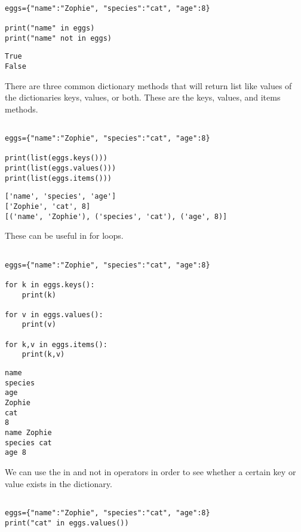 \documentclass[11pt]{article}
\begin{document}
\begin{verbatim}

eggs={"name":"Zophie", "species":"cat", "age":8}

print("name" in eggs)
print("name" not in eggs)

\end{verbatim}

\begin{verbatim}
True
False
\end{verbatim}


There are three common dictionary methods that will return list like values of the dictionaries keys, values, or both. These are the keys, values, and items methods.

\begin{verbatim}

eggs={"name":"Zophie", "species":"cat", "age":8}

print(list(eggs.keys()))
print(list(eggs.values()))
print(list(eggs.items()))

\end{verbatim}

\begin{verbatim}
['name', 'species', 'age']
['Zophie', 'cat', 8]
[('name', 'Zophie'), ('species', 'cat'), ('age', 8)]
\end{verbatim}


These can be useful in for loops.

\begin{verbatim}

eggs={"name":"Zophie", "species":"cat", "age":8}

for k in eggs.keys():
    print(k)

for v in eggs.values():
    print(v)

for k,v in eggs.items():
    print(k,v)

\end{verbatim}

\begin{verbatim}
name
species
age
Zophie
cat
8
name Zophie
species cat
age 8
\end{verbatim}


We can use the in and not in operators in order to see whether a certain key or value exists in the dictionary.

\begin{verbatim}

eggs={"name":"Zophie", "species":"cat", "age":8}
print("cat" in eggs.values())

\end{verbatim}
\end{document}
